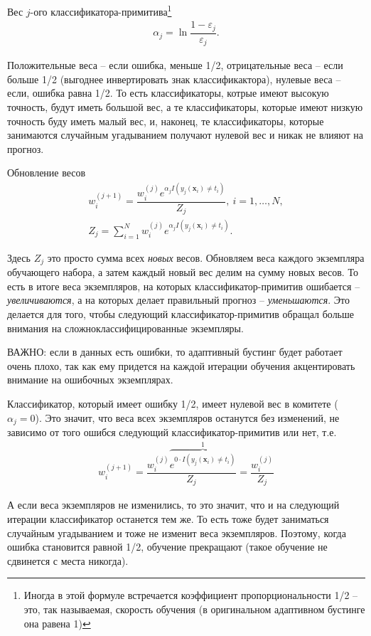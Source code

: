 \documentclass[%
	11pt,
	a4paper,
	utf8,
		]{article}
\begin{document}
Вес $ j $-ого классификатора-примитива\footnote{Иногда в этой формуле встречается коэффициент пропорциональности 1/2 -- это, так называемая, скорость обучения (в оригинальном адаптивном бустинге она равена 1)}
\begin{align*}
	\alpha_j = \ln \dfrac{1 - \varepsilon_j}{\varepsilon_j}.
\end{align*}

Положительные веса -- если ошибка, меньше 1/2, отрицательные веса -- если больше 1/2 (выгоднее инвертировать знак классификактора), нулевые веса -- если, ошибка равна 1/2. То есть классификаторы, котрые имеют высокую точность, будут иметь большой вес, а те классификаторы, которые имеют низкую точность буду иметь малый вес, и, наконец, те классификаторы, которые занимаются случайным угадыванием получают нулевой вес и никак не влияют на прогноз.

Обновление весов
\begin{align*}
	w_i^{(j+1)} = \dfrac{w_i^{(j)} e^{\alpha_j I(y_j(\mathbf{x}_i) \neq t_i)}}{Z_j},\ i = 1, \ldots, N,\\
	Z_j = \sum\limits_{i=1}^{N} w_i^{(j)} e^{\alpha_j I(y_j(\mathbf{x}_i) \neq t_i)}.
\end{align*}

Здесь $ Z_j $ это просто сумма всех \emph{новых} весов. Обновляем веса каждого экземпляра обучающего набора, а затем каждый новый вес делим на сумму новых весов. То есть в итоге веса экземпляров, на которых классификатор-примитив ошибается -- \emph{увеличиваются}, а на которых делает правильный прогноз -- \emph{уменьшаются}. Это делается для того, чтобы следующий классификатор-примитив обращал больше внимания на сложноклассифицированные экземпляры.

ВАЖНО: если в данных есть ошибки, то адаптивный бустинг будет работает очень плохо, так как ему придется на каждой итерации обучения акцентировать внимание на ошибочных экземплярах.

Классификатор, который имеет ошибку 1/2, имеет нулевой вес в комитете ($ \alpha_j = 0 $). Это значит, что веса всех экземпляров останутся без изменений, не зависимо от того ошибся следующий классификатор-примитив или нет, т.е.
\begin{align*}
	w_i^{(j + 1)} = \dfrac{w_i^{(j)} \overbrace{e^{0\cdot I(y_j(\mathbf{x}_i) \neq t_i)}}^{1}}{Z_j} = \dfrac{ w_i^{(j)} }{Z_j}
\end{align*}

А если веса экземпляров не изменились, то это значит, что и на следующий итерации классификатор останется тем же. То есть тоже будет заниматься случайным угадыванием и тоже не изменит веса экземпляров. Поэтому, когда ошибка становится равной 1/2, обучение прекращают (такое обучение не сдвинется с места никогда).
\end{document}
